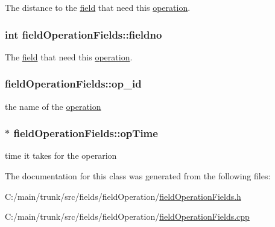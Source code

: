 The distance to the \hyperlink{classfield}{field} that need this \hyperlink{classoperation}{operation}. \hypertarget{classfield_operation_fields_abe9be7ea30f4ebbe53f17b8f07fffdb5}{
\subsubsection[{fieldno}]{\setlength{\rightskip}{0pt plus 5cm}int {\bf fieldOperationFields::fieldno}}}
\label{classfield_operation_fields_abe9be7ea30f4ebbe53f17b8f07fffdb5}


The \hyperlink{classfield}{field} that need this \hyperlink{classoperation}{operation}. \hypertarget{classfield_operation_fields_aebeb02a0325a6eed1778f051ff09a9a3}{
\subsubsection[{op\_\-id}]{ {\bf fieldOperationFields::op\_\-id}}}
\label{classfield_operation_fields_aebeb02a0325a6eed1778f051ff09a9a3}


the name of the \hyperlink{classoperation}{operation} \hypertarget{classfield_operation_fields_a45add696631149bbc8f7f9ace6529ad3}{
\subsubsection[{opTime}]{$\ast$ {\bf fieldOperationFields::opTime}}}
\label{classfield_operation_fields_a45add696631149bbc8f7f9ace6529ad3}


time it takes for the operarion 

The documentation for this class was generated from the following files:\begin{DoxyCompactItemize}
\item 
C:/main/trunk/src/fields/fieldOperation/\hyperlink{field_operation_fields_8h}{fieldOperationFields.h}\item 
C:/main/trunk/src/fields/fieldOperation/\hyperlink{field_operation_fields_8cpp}{fieldOperationFields.cpp}\end{DoxyCompactItemize}
